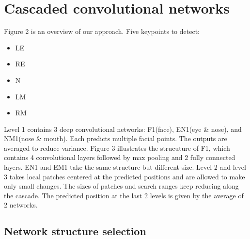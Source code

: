 \documentclass{ctexart}
\begin{document}
\section{Cascaded convolutional networks}
Figure 2 is an overview of our approach. Five keypoints to detect:
\begin{itemize}
	\item LE
	\item RE
	\item N
	\item LM
	\item RM
\end{itemize}

Level 1 contains 3 deep convolutional networks: F1(face), EN1(eye \& nose), and NM1(nose \& mouth).
Each predicts multiple facial points. The outputs are averaged to reduce variance. Figure 3
illustrates the strucuture of F1, which contains 4 convolutional layers followed by max pooling and
2 fully connected layers. EN1 and EM1 take the same structure but different size. Level 2 and level
3 takes local patches centered at the predicted positions and are allowed to make only small
changes. The sizes of patches and search ranges keep reducing along the cascade. The predicted
position at the last 2 levels is given by the average of 2 networks.

\subsection{Network structure selection}
\end{document}
